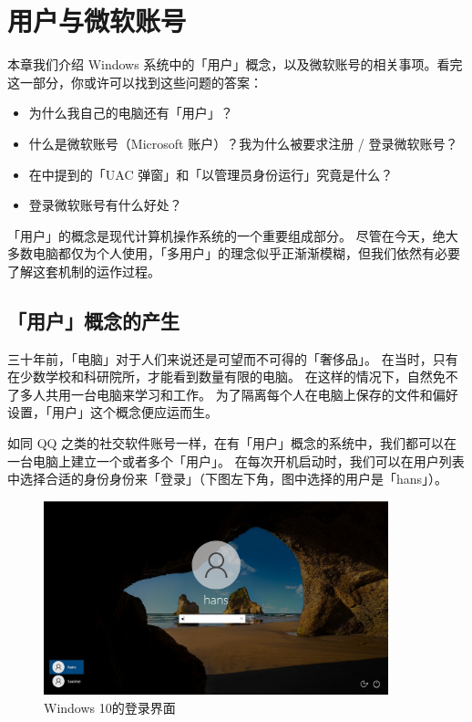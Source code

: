 \chapter{用户与微软账号}
\label{user-and-ms-account}

\begin{intro}
  本章我们介绍 Windows 系统中的「用户」概念，以及微软账号的相关事项。看完这一部分，你或许可以找到这些问题的答案：

  \begin{itemize}
    \item 为什么我自己的电脑还有「用户」？
    \item 什么是微软账号（Microsoft 账户）？我为什么被要求注册 / 登录微软账号？
    \item 在中提到的「UAC 弹窗」和「以管理员身份运行」究竟是什么？
    \item 登录微软账号有什么好处？
  \end{itemize}
\end{intro}

「用户」的概念是现代计算机操作系统的一个重要组成部分。
尽管在今天，绝大多数电脑都仅为个人使用，「多用户」的理念似乎正渐渐模糊，但我们依然有必要了解这套机制的运作过程。

\section{「用户」概念的产生}

三十年前，「电脑」对于人们来说还是可望而不可得的「奢侈品」。
在当时，只有在少数学校和科研院所，才能看到数量有限的电脑。
在这样的情况下，自然免不了多人共用一台电脑来学习和工作。
为了隔离每个人在电脑上保存的文件和偏好设置，「用户」这个概念便应运而生。

如同 QQ 之类的社交软件账号一样，在有「用户」概念的系统中，我们都可以在一台电脑上建立一个或者多个「用户」。
在每次开机启动时，我们可以在用户列表中选择合适的身份身份来「登录」（下图左下角，图中选择的用户是「hans」）。

\begin{figure}[htb!]
  \centering
  \includegraphics[width=10cm]{assets/Login.jpg}
  \caption{Windows 10的登录界面}
  \label{Login}
\end{figure}

